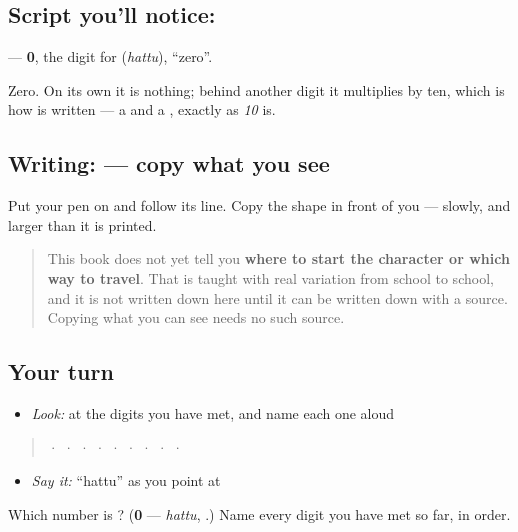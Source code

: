 \subsection*{Script you'll notice: }
\textbf{} — \textbf{0}, the digit for \textbf{} (\emph{hattu}), \textquotedblleft{}zero\textquotedblright{}.

Zero. On its own it is nothing; behind another digit it multiplies by ten, which is how  is written \textbf{} — a  and a , exactly as \emph{10} is.

\subsection*{Writing:  — copy what you see}
Put your pen on  and follow its line. Copy the shape in front of you — slowly, and larger than it is printed.

\begin{quote}
This book does not yet tell you \textbf{where to start the character or which way to travel}. That is taught with real variation from school to school, and it is not written down here until it can be written down with a source. Copying what you can see needs no such source.
\end{quote}

\subsection*{Your turn}
\begin{itemize}
\raggedright
  \item \emph{Look:} at the digits you have met, and name each one aloud
\end{itemize}

\begin{quote}
  ·    ·    ·    ·    ·    ·    ·    ·    ·  
\end{quote}

\begin{itemize}
\raggedright
  \item \emph{Say it:} \textquotedblleft{}hattu\textquotedblright{} as you point at 
\end{itemize}

\begin{tcolorbox}[breakable,colback=teal!4,colframe=teal!35!black,title={Before you move on}]
Which number is \textbf{}? (\textbf{0} — \emph{hattu}, .) Name every digit you have met so far, in order.
\end{tcolorbox}
